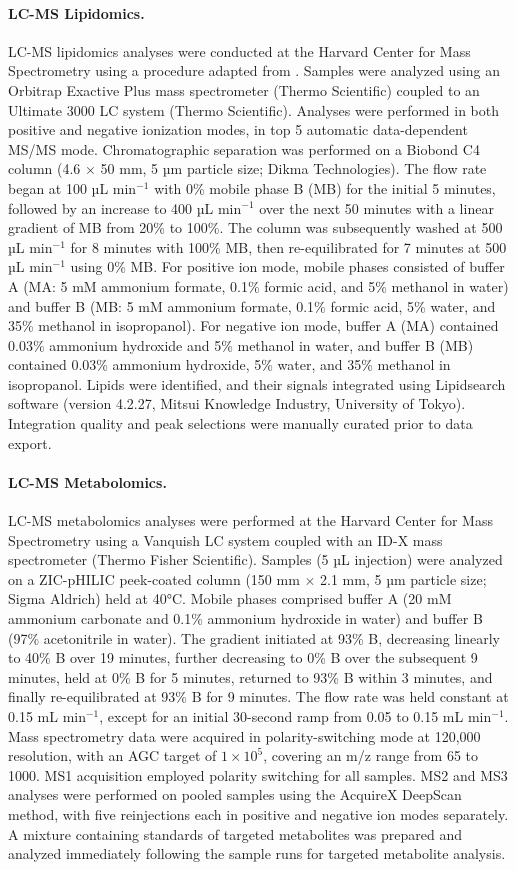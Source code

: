 \paragraph{LC-MS Lipidomics.}
LC-MS lipidomics analyses were conducted at the Harvard Center for Mass Spectrometry using a procedure adapted from \supercite{Miraldi2013-ng}. Samples were analyzed using an Orbitrap Exactive Plus mass spectrometer (Thermo Scientific) coupled to an Ultimate 3000 LC system (Thermo Scientific). Analyses were performed in both positive and negative ionization modes, in top 5 automatic data-dependent MS/MS mode. Chromatographic separation was performed on a Biobond C4 column (4.6 $\times$ 50 mm, 5 µm particle size; Dikma Technologies). The flow rate began at 100 µL min$^{-1}$ with 0\% mobile phase B (MB) for the initial 5 minutes, followed by an increase to 400 µL min$^{-1}$ over the next 50 minutes with a linear gradient of MB from 20\% to 100\%. The column was subsequently washed at 500 µL min$^{-1}$ for 8 minutes with 100\% MB, then re-equilibrated for 7 minutes at 500 µL min$^{-1}$ using 0\% MB. For positive ion mode, mobile phases consisted of buffer A (MA: 5 mM ammonium formate, 0.1\% formic acid, and 5\% methanol in water) and buffer B (MB: 5 mM ammonium formate, 0.1\% formic acid, 5\% water, and 35\% methanol in isopropanol). For negative ion mode, buffer A (MA) contained 0.03\% ammonium hydroxide and 5\% methanol in water, and buffer B (MB) contained 0.03\% ammonium hydroxide, 5\% water, and 35\% methanol in isopropanol. Lipids were identified, and their signals integrated using Lipidsearch software (version 4.2.27, Mitsui Knowledge Industry, University of Tokyo). Integration quality and peak selections were manually curated prior to data export.

\paragraph{LC-MS Metabolomics.}
LC-MS metabolomics analyses were performed at the Harvard Center for Mass Spectrometry using a Vanquish LC system coupled with an ID-X mass spectrometer (Thermo Fisher Scientific). Samples (5 µL injection) were analyzed on a ZIC-pHILIC peek-coated column (150 mm $\times$ 2.1 mm, 5 µm particle size; Sigma Aldrich) held at 40°C. Mobile phases comprised buffer A (20 mM ammonium carbonate and 0.1\% ammonium hydroxide in water) and buffer B (97\% acetonitrile in water). The gradient initiated at 93\% B, decreasing linearly to 40\% B over 19 minutes, further decreasing to 0\% B over the subsequent 9 minutes, held at 0\% B for 5 minutes, returned to 93\% B within 3 minutes, and finally re-equilibrated at 93\% B for 9 minutes. The flow rate was held constant at 0.15 mL min$^{-1}$, except for an initial 30-second ramp from 0.05 to 0.15 mL min$^{-1}$. Mass spectrometry data were acquired in polarity-switching mode at 120,000 resolution, with an AGC target of $1 \times 10^5$, covering an m/z range from 65 to 1000. MS1 acquisition employed polarity switching for all samples. MS2 and MS3 analyses were performed on pooled samples using the AcquireX DeepScan method, with five reinjections each in positive and negative ion modes separately. A mixture containing standards of targeted metabolites was prepared and analyzed immediately following the sample runs for targeted metabolite analysis.

